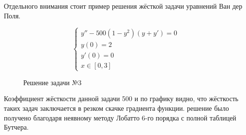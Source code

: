 Отдельного внимания стоит пример решения жёсткой задачи уравнений Ван дер Поля.

$$
\begin{cases}
    y'' - 500(1 - y^2)(y + y') = 0\\
    y(0) = 2\\
    y'(0) = 0\\
    x \in [0, 3]
\end{cases}
$$

\begin{figure}
    
    \caption{Решение задачи №3}
    \label{fig:task3}
\end{figure}

Коэффициент жёсткости данной задачи 500 и по графику видно, что жёсткость таких задач заключается в резком скачке градиента функции.
решение было получено благодаря неявному методу Лобатто 6-го порядка с полной таблицей Бутчера.

